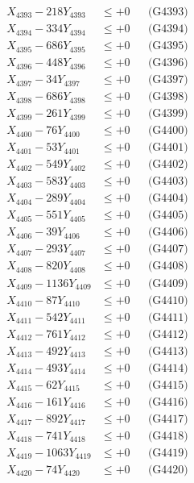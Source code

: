 \documentclass[a4paper,10pt]{article}
\begin{document}
{\begin{align}
X_{4393} - 218Y_{4393} &\leq +0 && \text{(G4393)} \\
X_{4394} - 334Y_{4394} &\leq +0 && \text{(G4394)} \\
X_{4395} - 686Y_{4395} &\leq +0 && \text{(G4395)} \\
X_{4396} - 448Y_{4396} &\leq +0 && \text{(G4396)} \\
X_{4397} - 34Y_{4397} &\leq +0 && \text{(G4397)} \\
X_{4398} - 686Y_{4398} &\leq +0 && \text{(G4398)} \\
X_{4399} - 261Y_{4399} &\leq +0 && \text{(G4399)} \\
X_{4400} - 76Y_{4400} &\leq +0 && \text{(G4400)} \\
\allowbreak
X_{4401} - 53Y_{4401} &\leq +0 && \text{(G4401)} \\
X_{4402} - 549Y_{4402} &\leq +0 && \text{(G4402)} \\
X_{4403} - 583Y_{4403} &\leq +0 && \text{(G4403)} \\
X_{4404} - 289Y_{4404} &\leq +0 && \text{(G4404)} \\
X_{4405} - 551Y_{4405} &\leq +0 && \text{(G4405)} \\
X_{4406} - 39Y_{4406} &\leq +0 && \text{(G4406)} \\
X_{4407} - 293Y_{4407} &\leq +0 && \text{(G4407)} \\
X_{4408} - 820Y_{4408} &\leq +0 && \text{(G4408)} \\
X_{4409} - 1136Y_{4409} &\leq +0 && \text{(G4409)} \\
X_{4410} - 87Y_{4410} &\leq +0 && \text{(G4410)} \\
\allowbreak
X_{4411} - 542Y_{4411} &\leq +0 && \text{(G4411)} \\
X_{4412} - 761Y_{4412} &\leq +0 && \text{(G4412)} \\
X_{4413} - 492Y_{4413} &\leq +0 && \text{(G4413)} \\
X_{4414} - 493Y_{4414} &\leq +0 && \text{(G4414)} \\
X_{4415} - 62Y_{4415} &\leq +0 && \text{(G4415)} \\
X_{4416} - 161Y_{4416} &\leq +0 && \text{(G4416)} \\
X_{4417} - 892Y_{4417} &\leq +0 && \text{(G4417)} \\
X_{4418} - 741Y_{4418} &\leq +0 && \text{(G4418)} \\
X_{4419} - 1063Y_{4419} &\leq +0 && \text{(G4419)} \\
X_{4420} - 74Y_{4420} &\leq +0 && \text{(G4420)} \\

\end{align}}
\end{document}
